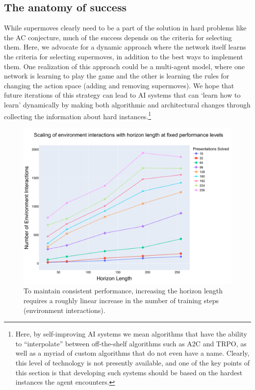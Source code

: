 \subsection{The anatomy of success}

While supermoves clearly need to be a part of the solution in hard problems like the AC conjecture, much of the success depends on the criteria for selecting them. Here, we advocate for a dynamic approach where the network itself learns the criteria for selecting supermoves, in addition to the best ways to implement them. One realization of this approach could be a multi-agent model, where one network is learning to play the game and the other is learning the rules for changing the action space (adding and removing supermoves). We hope that future iterations of this strategy can lead to AI systems that can `learn how to learn' dynamically by making both algorithmic and architectural changes through collecting the information about hard instances.\footnote{Here, by self-improving AI systems we mean algorithms that have the ability to ``interpolate'' between off-the-shelf algorithms such as A2C and TRPO, as well as a myriad of custom algorithms that do not even have a name. Clearly, this level of technology is not presently available, and one of the key points of this section is that developing such systems should be based on the hardest instances the agent encounters.}

\begin{figure}
	\centering
	\includegraphics[scale=0.35]{fig/env_vs_horizon.pdf}
	\caption{To maintain consistent performance, increasing the horizon length requires a roughly linear increase in the number of training steps (environment interactions).}
	\label{fig:env_vs_horizon}
\end{figure}

